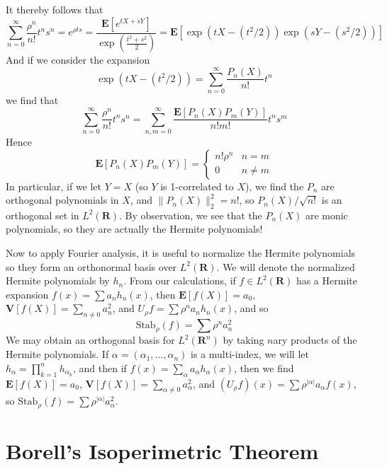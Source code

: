 %
It thereby follows that
%
\[ \sum_{n = 0}^\infty \frac{\rho^n}{n!} t^n s^n = e^{\rho t s} = \frac{\mathbf{E}[e^{tX + sY}]}{\exp \left( \frac{t^2 + s^2}{2} \right)} = \mathbf{E} \left[ \exp  \left( tX - (t^2/2) \right) \exp \left( sY - (s^2/2) \right) \right] \]
%
And if we consider the expansion
%
\[ \exp \left( tX - (t^2/2) \right) = \sum_{n = 0}^\infty \frac{P_n(X)}{n!} t^n \]
%
we find that
%
\[ \sum_{n = 0}^\infty \frac{\rho^n}{n!} t^n s^n = \sum_{n,m = 0}^\infty \frac{\mathbf{E}[P_n(X) P_m(Y)]}{n! m!} t^n s^m \]
%
Hence
%
\[ \mathbf{E}[P_n(X) P_m(Y)] = \begin{cases} n! \rho^n & n = m \\ 0 & n \neq m \end{cases} \]
%
In particular, if we let $Y = X$ (so $Y$ is 1-correlated to $X$), we find the $P_n$ are orthogonal polynomials in $X$, and $\| P_n(X) \|_2^2 = n!$, so $P_n(X)/\sqrt{n!}$ is an orthogonal set in $L^2(\mathbf{R})$. By observation, we see that the $P_n(X)$ are monic polynomials, so they are actually the Hermite polynomials!

Now to apply Fourier analysis, it is useful to normalize the Hermite polynomials so they form an orthonormal basis over $L^2(\mathbf{R})$. We will denote the normalized Hermite polynomials by $h_n$. From our calculations, if $f \in L^2(\mathbf{R})$ has a Hermite expansion $f(x) = \sum a_n h_n(x)$, then $\mathbf{E}[f(X)] = a_0$, $\mathbf{V}[f(X)] = \sum_{n \neq 0} a_n^2$, and $U_\rho f = \sum \rho^n a_n h_n(x)$, and so
%
\[ \text{Stab}_\rho(f) = \sum \rho^n a_n^2 \]
%
We may obtain an orthogonal basis for $L^2(\mathbf{R}^n)$ by taking $n$ary products of the Hermite polynomials. If $\alpha = (\alpha_1, \dots, \alpha_n)$ is a multi-index, we will let $h_\alpha = \prod_{k = 1}^n h_{\alpha_k}$, and then if $f(x) = \sum_\alpha a_\alpha h_\alpha(x)$, then we find $\mathbf{E}[f(X)] = a_0$, $\mathbf{V}[f(X)] = \sum_{\alpha \neq 0} a_\alpha^2$, and $(U_\rho f)(x) = \sum \rho^{|\alpha|} a_\alpha f(x)$, so $\text{Stab}_\rho(f) = \sum \rho^{|\alpha|} a_\alpha^2$.

\section{Borell's Isoperimetric Theorem}

